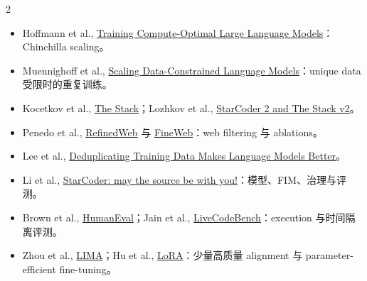 \documentclass[a4paper]{article}
\begin{document}
\begin{multicols}{2}
\footnotesize
\begin{itemize}
  \setlength{\itemsep}{0.15em}
  \item Hoffmann et al., \href{https://arxiv.org/abs/2203.15556}{Training Compute-Optimal Large Language Models}：Chinchilla scaling。
  \item Muennighoff et al., \href{https://arxiv.org/abs/2305.16264}{Scaling Data-Constrained Language Models}：unique data 受限时的重复训练。
  \item Kocetkov et al., \href{https://arxiv.org/abs/2211.15533}{The Stack}；Lozhkov et al., \href{https://arxiv.org/abs/2402.19173}{StarCoder 2 and The Stack v2}。
  \item Penedo et al., \href{https://arxiv.org/abs/2306.01116}{RefinedWeb} 与 \href{https://arxiv.org/abs/2406.17557}{FineWeb}：web filtering 与 ablations。
  \item Lee et al., \href{https://arxiv.org/abs/2107.06499}{Deduplicating Training Data Makes Language Models Better}。
  \item Li et al., \href{https://arxiv.org/abs/2305.06161}{StarCoder: may the source be with you!}：模型、FIM、治理与评测。
  \item Brown et al., \href{https://arxiv.org/abs/2107.03374}{HumanEval}；Jain et al., \href{https://arxiv.org/abs/2403.07974}{LiveCodeBench}：execution 与时间隔离评测。
  \item Zhou et al., \href{https://arxiv.org/abs/2305.11206}{LIMA}；Hu et al., \href{https://arxiv.org/abs/2106.09685}{LoRA}：少量高质量 alignment 与 parameter-efficient fine-tuning。
\end{itemize}
\end{multicols}
\end{document}
